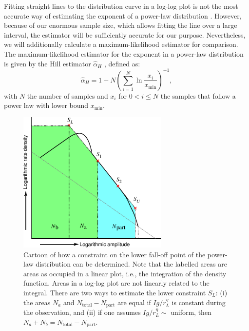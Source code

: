\documentclass[useAMS,usenatbib]{mn2e}
\begin{document}
Fitting straight lines to the distribution curve in a log-log plot is not the most accurate way of estimating the exponent of a power-law distribution \citep{power-law-distribution}. However, because of our enormous sample size, which allows fitting the line over a large interval, the estimator will be sufficiently accurate for our purpose. Nevertheless, we will additionally calculate a maximum-likelihood estimator for comparison. The maximum-likelihood estimator for the exponent in a power-law distribution is given by the Hill estimator $\hat \alpha_H$ \citep{hill-estimator, power-law-distribution}, defined as:
\begin{equation} \label{eq:hill}
 \hat \alpha_H = 1 + N \left(\sum\limits_{i=1}^{N} \ln \frac{x_i}{x_\textrm{min}} \right)^{-1},
\end{equation}
with $N$ the number of samples and $x_i$ for $0 < i \le N$ the samples that follow a power law with lower bound $x_\textrm{min}$.

\begin{figure}
\begin{center}
\includegraphics[width=7.5cm]{img/explanation-lower-constraint/FindingConstraints}
\caption{Cartoon of how a constraint on the lower fall-off point of the power-law distribution can be determined. Note that the labelled areas are areas as occupied in a linear plot, i.e., the integration of the density function. Areas in a log-log plot are not linearly related to the integral. There are two ways to estimate the lower constraint $S_L$: (i) the areas $N_a$ and $N_\textrm{total}-N_\textrm{part}$ are equal if $Ig/r_L^\eta$ is constant during the observation, and (ii) if one assumes $Ig/r_L^\eta\sim$ uniform, then $N_a+N_b = N_\textrm{total}-N_\textrm{part}$.}
\label{fig:explanation-constraints}
\end{center}
\end{figure}
\end{document}
